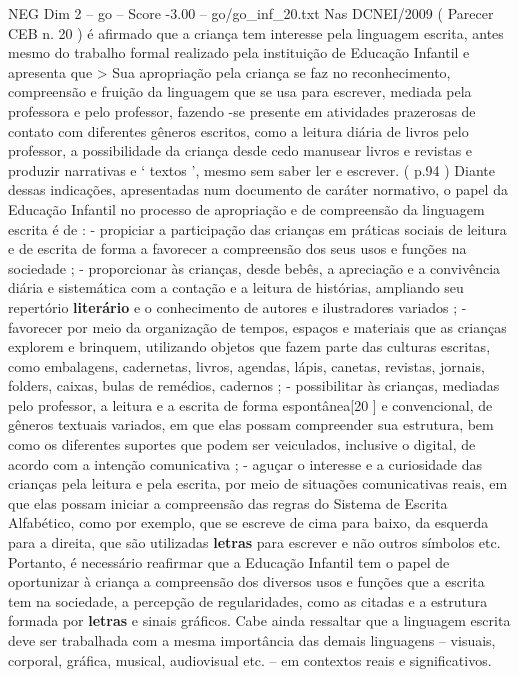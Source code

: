 \begin{textsample}{NEG Dim 2 – go – Score -3.00 – go/go\_inf\_20.txt}
Nas DCNEI/2009 ( Parecer CEB n. 20 ) é afirmado que a criança tem interesse pela linguagem escrita, antes mesmo do trabalho formal realizado pela instituição de Educação Infantil e apresenta que > Sua apropriação pela criança se faz no reconhecimento, compreensão e fruição da linguagem que se usa para escrever, mediada pela professora e pelo professor, fazendo -se presente em atividades prazerosas de contato com diferentes gêneros escritos, como a leitura diária de livros pelo professor, a possibilidade da criança desde cedo manusear livros e revistas e produzir narrativas e ‘ textos ’, mesmo sem saber ler e escrever. ( p.94 ) Diante dessas indicações, apresentadas num documento de caráter normativo, o papel da Educação Infantil no processo de apropriação e de compreensão da linguagem escrita é de : - propiciar a participação das crianças em práticas sociais de leitura e de escrita de forma a favorecer a compreensão dos seus usos e funções na sociedade ; - proporcionar às crianças, desde bebês, a apreciação e a convivência diária e sistemática com a contação e a leitura de histórias, ampliando seu repertório \textbf{literário} e o conhecimento de autores e ilustradores variados ; - favorecer por meio da organização de tempos, espaços e materiais que as crianças explorem e brinquem, utilizando objetos que fazem parte das culturas escritas, como embalagens, cadernetas, livros, agendas, lápis, canetas, revistas, jornais, folders, caixas, bulas de remédios, cadernos ; - possibilitar às crianças, mediadas pelo professor, a leitura e a escrita de forma espontânea[20 ] e convencional, de gêneros textuais variados, em que elas possam compreender sua estrutura, bem como os diferentes suportes que podem ser veiculados, inclusive o digital, de acordo com a intenção comunicativa ; - aguçar o interesse e a curiosidade das crianças pela leitura e pela escrita, por meio de situações comunicativas reais, em que elas possam iniciar a compreensão das regras do Sistema de Escrita Alfabético, como por exemplo, que se escreve de cima para baixo, da esquerda para a direita, que são utilizadas \textbf{letras} para escrever e não outros símbolos etc.
Portanto, é necessário reafirmar que a Educação Infantil tem o papel de oportunizar à criança a compreensão dos diversos usos e funções que a escrita tem na sociedade, a percepção de regularidades, como as citadas e a estrutura formada por \textbf{letras} e sinais gráficos.
Cabe ainda ressaltar que a linguagem escrita deve ser trabalhada com a mesma importância das demais linguagens – visuais, corporal, gráfica, musical, audiovisual etc. – em contextos reais e significativos.

\end{textsample}
